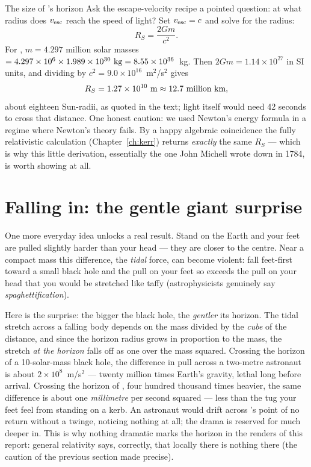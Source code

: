 \begin{worked}{The size of \sgra{}'s horizon}
Ask the escape-velocity recipe a pointed question: at what radius does
$v_{\rm esc}$ reach the speed of light? Set $v_{\rm esc}=c$ and solve
for the radius:
\[
R_S=\frac{2Gm}{c^2}.
\]
For \sgra{}, $m = 4.297$ million solar masses
$= 4.297\times10^{6}\times1.989\times10^{30}~{\rm kg}
= 8.55\times10^{36}$~kg. Then $2Gm = 1.14\times10^{27}$ in SI units,
and dividing by $c^2 = 9.0\times10^{16}$~m$^2$/s$^2$ gives
\[
R_S = 1.27\times10^{10}~{\rm m} \approx 12.7\ \hbox{million km},
\]
about eighteen Sun-radii, as quoted in the text; light itself would
need 42 seconds to cross that distance. One honest caution: we used
Newton's energy formula in a regime where Newton's theory fails. By a
happy algebraic coincidence the fully relativistic calculation
(Chapter~\ref{ch:kerr}) returns \emph{exactly} the same $R_S$ — which
is why this little derivation, essentially the one John Michell wrote
down in 1784, is worth showing at all.
\end{worked}

\section{Falling in: the gentle giant surprise}

One more everyday idea unlocks a real result. Stand on the Earth and
your feet are pulled slightly harder than your head — they are closer
to the centre. Near a compact mass this difference, the \emph{tidal}
force, can become violent: fall feet-first toward a small black hole
and the pull on your feet so exceeds the pull on your head that you
would be stretched like taffy (astrophysicists genuinely say
\emph{spaghettification}).

Here is the surprise: the bigger the black hole, the \emph{gentler}
its horizon. The tidal stretch across a falling body depends on the
mass divided by the \emph{cube} of the distance, and since the horizon
radius grows in proportion to the mass, the stretch \emph{at the
horizon} falls off as one over the mass squared. Crossing the horizon
of a 10-solar-mass black hole, the difference in pull across a
two-metre astronaut is about $2\times10^{8}$~m/s$^2$ — twenty million
times Earth's gravity, lethal long before arrival. Crossing the
horizon of \sgra{}, four hundred thousand times heavier, the same
difference is about one \emph{millimetre} per second squared — less
than the tug your feet feel from standing on a kerb. An astronaut
would drift across \sgra's point of no return without a twinge,
noticing nothing at all; the drama is reserved for much deeper in.
This is why nothing dramatic marks the horizon in the renders of this
report: general relativity says, correctly, that locally there is
nothing there (the caution of the previous section made precise).

